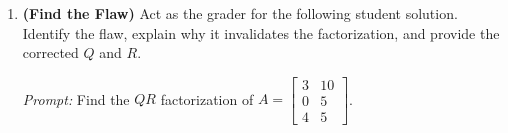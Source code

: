 \documentclass[11pt, letterpaper]{article}
\theoremstyle{definition}
\theoremstyle{remark}
\begin{document}
\begin{enumerate}[label=\textbf{Problem \arabic*.}, leftmargin=*, itemsep=0.9em]
    \emph{Student's Solution:}
    \begin{align*}
        v_1 &= x_1 = \begin{bmatrix} 1 \\ 1 \\ 0 \end{bmatrix}, \\
        v_2 &= x_2 - \frac{x_2 \cdot v_1}{v_1 \cdot v_1} v_1 = \begin{bmatrix} 1 \\ 0 \\ 1 \end{bmatrix} - \frac{1}{2}\begin{bmatrix} 1 \\ 1 \\ 0 \end{bmatrix} = \begin{bmatrix} 1/2 \\ -1/2 \\ 1 \end{bmatrix}, \\
        v_3 &= x_3 - \frac{x_3 \cdot v_1}{v_1 \cdot v_1} v_1 - \frac{x_3 \cdot x_2}{x_2 \cdot x_2} x_2 = \begin{bmatrix} 0 \\ 2 \\ 2 \end{bmatrix} - \frac{2}{2}\begin{bmatrix} 1 \\ 1 \\ 0 \end{bmatrix} - \frac{2}{2}\begin{bmatrix} 1 \\ 0 \\ 1 \end{bmatrix} = \begin{bmatrix} -2 \\ 1 \\ 1 \end{bmatrix}.
    \end{align*}

    \item \textbf{(Find the Flaw)} Act as the grader for the following student solution. Identify the flaw, explain why it invalidates the factorization, and provide the corrected $Q$ and $R$.
    
    \emph{Prompt:} Find the $QR$ factorization of $A = \begin{bmatrix} 3 & 10 \\ 0 & 5 \\ 4 & 5 \end{bmatrix}$.
    

\end{enumerate}
\end{document}
